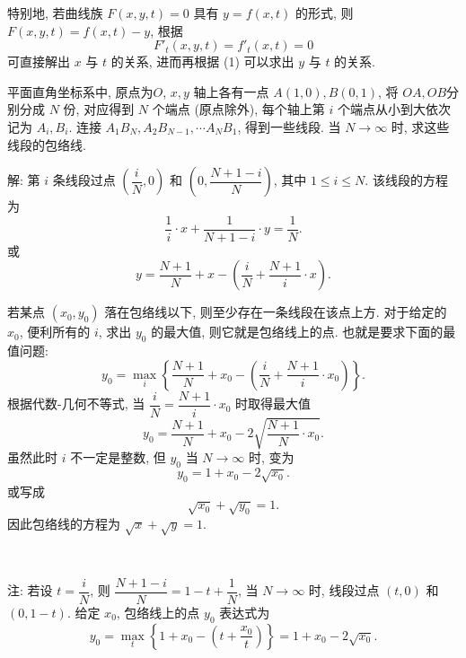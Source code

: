 特别地, 若曲线族 $F(x,y,t)=0$ 具有 $y=f(x,t)$ 的形式, 则 $F(x,y,t)=f(x,t)-y$, 根据
\[ F'_t(x,y,t) = f'_t(x,t) = 0 \]
可直接解出 $x$ 与 $t$ 的关系, 进而再根据 (1) 可以求出 $y$ 与 $t$ 的关系.

\newpage

平面直角坐标系中, 原点为$O$, $x,y$ 轴上各有一点 $A(1,0), B(0,1)$, 将 $OA,OB$分别分成 $N$ 份, 对应得到 $N$ 个端点 (原点除外), 每个轴上第 $i$ 个端点从小到大依次记为 $A_i, B_i$. 连接 $A_1B_N, A_2B_{N-1}, \cdots A_NB_1$, 得到一些线段. 当 $N\to\infty$ 时, 求这些线段的包络线.
\begin{figure*}[htbp]
\centering
{}
\end{figure*}

解: 第 $i$ 条线段过点 $(\dfrac{i}{N}, 0)$ 和 $(0, \dfrac{N+1-i}{N})$, 其中 $1\le i\le N$. 该线段的方程为
\[\frac{1}{i}\cdot x + \frac{1}{N+1-i}\cdot y=\frac{1}{N}.\]
或
\[y=\frac{N+1}{N} + x - \left(\frac{i}{N} + \frac{N+1}{i}\cdot x\right).\]

若某点 $(x_0,y_0)$ 落在包络线以下, 则至少存在一条线段在该点上方. 对于给定的 $x_0$, 便利所有的 $i$, 求出 $y_0$ 的最大值, 则它就是包络线上的点. 也就是要求下面的最值问题:
\[y_0 = \mathop{\max}_i \left\{ \frac{N+1}{N} + x_0 - \left(\frac{i}{N} + \frac{N+1}{i}\cdot x_0\right) \right\} .\]
根据代数-几何不等式, 当 $\dfrac{i}{N} = \dfrac{N+1}{i}\cdot x_0$ 时取得最大值
\[ y_0 = \frac{N+1}{N} + x_0 - 2\sqrt{\frac{N+1}{N}\cdot x_0} .\]
虽然此时 $i$ 不一定是整数, 但 $y_0$ 
当 $N\to\infty$ 时, 变为
\[y_0 = 1 + x_0 - 2\sqrt{x_0} .\]
或写成
\[\sqrt{x_0}+\sqrt{y_0} = 1.\]
因此包络线的方程为 $\sqrt{x}+\sqrt{y}=1$.

~

注: 若设 $t = \dfrac{i}{N}$, 则 $\dfrac{N+1-i}{N} = 1 - t + \dfrac{1}{N}$, 当 $N\to\infty$ 时, 线段过点 $(t,0)$ 和 $(0,1-t)$. 给定 $x_0$, 包络线上的点 $y_0$ 表达式为
\[ y_0 = \mathop{\max}_t\left\{ 1+x_0 - (t+\frac{x_0}{t}) \right\} = 1 + x_0 - 2\sqrt{x_0} .\]


